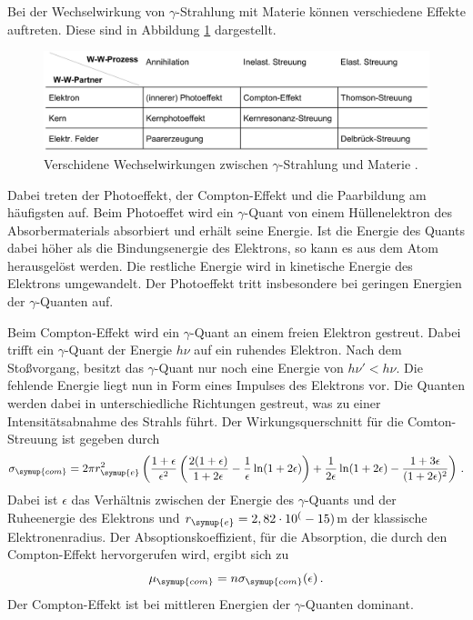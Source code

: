 Bei der Wechselwirkung von $\gamma$-Strahlung mit Materie können verschiedene
Effekte auftreten. Diese sind in Abbildung \ref{fig:wechselwirkung} dargestellt.

\begin{figure}
  \centering
  \includegraphics[width=\textwidth]{data/wechselwirkung.png}
  \caption{Verschidene Wechselwirkungen zwischen $\gamma$-Strahlung und Materie \cite{Versuchsanleitung}.}
  \label{fig:wechselwirkung}
\end{figure}

Dabei treten der Photoeffekt, der Compton-Effekt und die Paarbildung am häufigsten auf.
Beim Photoeffet wird ein $\gamma$-Quant von einem Hüllenelektron des Absorbermaterials
absorbiert und erhält seine Energie. Ist die Energie des Quants dabei höher als die
Bindungsenergie des Elektrons, so kann es aus dem Atom herausgelöst werden. Die
restliche Energie wird in kinetische Energie des Elektrons umgewandelt. Der Photoeffekt
tritt insbesondere bei geringen Energien der $\gamma$-Quanten auf.

Beim Compton-Effekt wird ein $\gamma$-Quant an einem freien Elektron gestreut.
Dabei trifft ein $\gamma$-Quant der Energie $h \nu$ auf ein ruhendes Elektron.
Nach dem Stoßvorgang, besitzt das $\gamma$-Quant nur noch eine Energie von $h \nu' < h \nu$.
Die fehlende Energie liegt nun in Form eines Impulses des Elektrons vor. Die Quanten
werden dabei in unterschiedliche Richtungen gestreut, was zu einer Intensitätsabnahme
des Strahls führt. Der Wirkungsquerschnitt für die Comton-Streuung ist gegeben
durch
\begin{equation}
  \sigma_{\symup{com}}= 2 \pi r_{\symup{e}}^2 \left(\frac{1+\epsilon}{\epsilon^2}
  \left(\frac{2(1+\epsilon)}{1+2\epsilon}-\frac{1}{\epsilon}\ln(1+2\epsilon)\right)
  +\frac{1}{2\epsilon}\ln(1+2\epsilon)-\frac{1+3\epsilon}{(1+2\epsilon)^2}\right) \,.
  \label{eqn:sigma_compton}
\end{equation}
Dabei ist $\epsilon$ das Verhältnis zwischen der Energie des $\gamma$-Quants und
der Ruheenergie des Elektrons und $r_{\symup{e}} = 2,82 \cdot 10^(-15)$m%
der klassische Elektronenradius. Der Absoptionskoeffizient, für die Absorption, die
durch den Compton-Effekt hervorgerufen wird, ergibt sich zu
\begin{equation}
  \mu_{\symup{com}}=n \sigma_{\symup{com}}(\epsilon) \,.
  \label{eqn:mucompton}
\end{equation}
Der Compton-Effekt ist bei mittleren Energien der $\gamma$-Quanten dominant.

